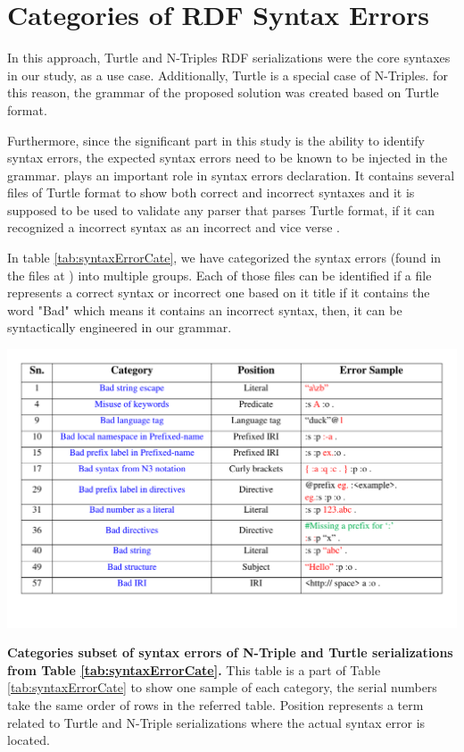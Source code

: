 \section{Categories of RDF Syntax Errors}
 In this approach, Turtle and N-Triples RDF serializations were the core syntaxes in our study, as a use case. Additionally, Turtle is a special case of N-Triples. for this reason, the grammar of the proposed solution was created based on Turtle format. 
 
 Furthermore, since the significant part in this study is the ability to identify syntax errors, the expected syntax errors need to be known to be injected in the grammar. \cite{TurtleTests:Online} plays an important role in syntax errors declaration. It contains several files of Turtle format to show both correct and incorrect syntaxes and it is supposed to be used to validate any parser that parses Turtle format, if it can recognized a incorrect syntax as an incorrect and vice verse . 
 
 In table \ref{tab:syntaxErrorCate}, we have categorized the syntax errors (found in the files at \cite{TurtleTests:Online}) into multiple groups. Each of those files can be identified if a file represents a correct syntax or incorrect one based on it title if it contains the word "Bad" which means it contains an incorrect syntax, then, it can be syntactically engineered in our grammar.  
 \begin{table}[tbp]
 	\centering
\includegraphics[width=5.5in]{images/TrimmedBigTable.pdf}
		\setlength\abovecaptionskip{-10mm}

	\caption{\textbf{Categories subset of syntax errors of N-Triple and Turtle serializations from Table \ref{tab:syntaxErrorCate}.} This table is a part of Table \ref{tab:syntaxErrorCate} to show one sample of each category, the serial numbers take the same order of rows in the referred table. Position represents a term related to Turtle and N-Triple serializations where the actual syntax error is located.}
	\label{tab:trimmedTable}
\end{table}

